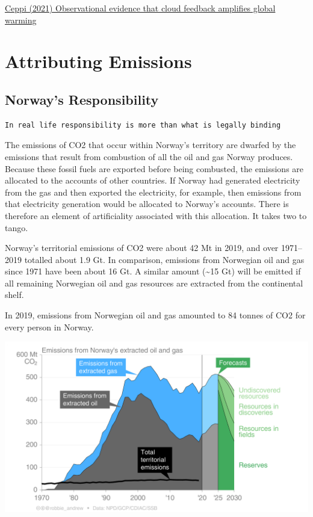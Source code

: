 \documentclass[
]{book}
\begin{document}
\href{https://www.pnas.org/content/118/30/e2026290118}{Ceppi (2021) Observational evidence that cloud feedback amplifies global warming}

\hypertarget{attributing-emissions}{%
\section{Attributing Emissions}\label{attributing-emissions}}

\hypertarget{norways-responsibility}{%
\subsection{Norway's Responsibility}\label{norways-responsibility}}

\begin{verbatim}
In real life responsibility is more than what is legally binding
\end{verbatim}

The emissions of CO2 that occur within Norway's territory are dwarfed by the emissions that result from combustion of all the oil and gas Norway produces. Because these fossil fuels are exported before being combusted, the emissions are allocated to the accounts of other countries. If Norway had generated electricity from the gas and then exported the electricity, for example, then emissions from that electricity generation would be allocated to Norway's accounts. There is therefore an element of artificiality associated with this allocation. It takes two to tango.

Norway's territorial emissions of CO2 were about 42 Mt in 2019, and over 1971--2019 totalled about 1.9 Gt. In comparison, emissions from Norwegian oil and gas since 1971 have been about 16 Gt. A similar amount (\textasciitilde15 Gt) will be emitted if all remaining Norwegian oil and gas resources are extracted from the continental shelf.

In 2019, emissions from Norwegian oil and gas amounted to 84 tonnes of CO2 for every person in Norway.

\includegraphics{fig/Emissions_extracted_Oil_Gas_Norway.png}
\end{document}
